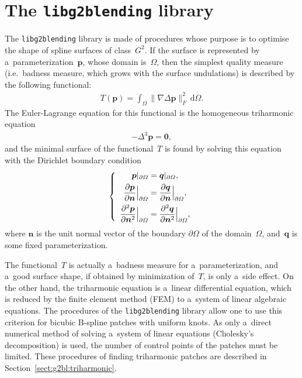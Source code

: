 

\chapter{\label{chap:g2blending}The \texttt{libg2blending} library}

The \texttt{libg2blending} library is made of procedures whose purpose is
to optimise the shape of spline surfaces of class~$G^2$. If the surface
is represented by a~parameterization~$\bm{p}$, whose domain is~$\varOmega$,
then the simplest quality measure (i.e.\ badness measure, which grows with
the surface undulations) is described by the following functional:
\newcommand{\nabDel}{\nabla\!\Delta}
\begin{align}
\label{eq:g2bl:T}
  T(\bm{p}) = \int_{\varOmega}\|\nabDel\bm{p}\|_F^2\,\mathrm{d}\varOmega.
\end{align}
The Euler-Lagrange equation for this functional is the homogeneous
triharmonic equation
\begin{align}
\label{eq:g2bl:triharm}
  -\Delta^3\bm{p}=\bm{0},
\end{align}
and the minimal surface of the functional~$T$ is found by solving this
equation with the Dirichlet boundary condition
\begin{align}
\label{eq:g2mbl:bound:cond}
  \left\{\begin{array}{r@{\;}c@{\;}l}
    \displaystyle
    \bm{p}|_{\partial\varOmega} &=&
    \displaystyle
    \bm{q}|_{\partial\varOmega}, \\[4pt]
    \displaystyle
    \frac{\partial\bm{p}}{\partial\bm{n}}\Big|_{\partial\varOmega} &=&
    \displaystyle
    \frac{\partial\bm{q}}{\partial\bm{n}}\Big|_{\partial\varOmega}, \\[8pt]
    \displaystyle
    \frac{\partial^2\bm{p}}{\partial\bm{n}^2}\Big|_{\partial\varOmega} &=&
    \displaystyle
    \frac{\partial^2\bm{q}}{\partial\bm{n}^2}\Big|_{\partial\varOmega},
  \end{array}\right.
\end{align}
where $\bm{n}$ is the unit normal vector of the boundary $\partial\varOmega$
of the domain~$\varOmega$, and~$\bm{q}$ is some fixed parameterization.

The functional~$T$ is actually a~badness measure for a~parameterization, and
a~good surface shape, if obtained by minimization of~$T$, is only a~side
effect. On the other hand, the triharmonic equation is a~linear differential
equation, which is reduced by the finite element method (FEM) to a~system of
linear algebraic equations. The procedures of the \texttt{libg2blending}
library allow one to use this criterion for bicubic B-spline patches with
uniform knots. As only a~direct numerical method of solving a~system of
linear equations (Cholesky's decomposition) is used, the number of control
points of the patches must be limited.
These procedures of finding triharmonic patches are described in
Section~\ref{sect:g2bl:triharmonic}.

